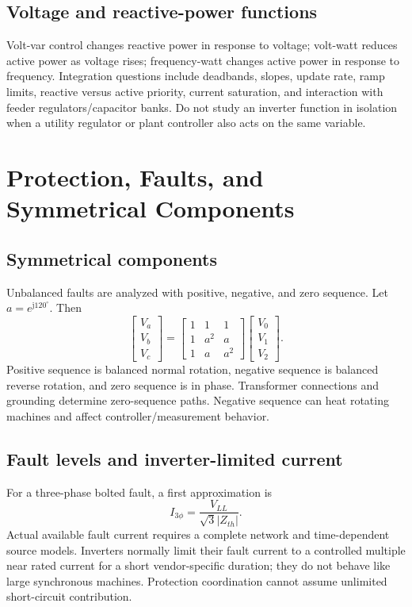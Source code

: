 \documentclass[11pt]{article}
\newcommand{\V}{\mathrm{V}}
\newcommand{\jop}{\mathrm{j}}
\begin{document}
\subsection{Voltage and reactive-power functions}
Volt-var control changes reactive power in response to voltage; volt-watt
reduces active power as voltage rises; frequency-watt changes active power in
response to frequency. Integration questions include deadbands, slopes, update
rate, ramp limits, reactive versus active priority, current saturation, and
interaction with feeder regulators/capacitor banks. Do not study an inverter
function in isolation when a utility regulator or plant controller also acts on
the same variable.

\section{Protection, Faults, and Symmetrical Components}

\subsection{Symmetrical components}
Unbalanced faults are analyzed with positive, negative, and zero sequence. Let
$a=e^{\jop120^\circ}$. Then
\[
\begin{bmatrix}V_a\\V_b\\V_c\end{bmatrix}=
\begin{bmatrix}1&1&1\\1&a^2&a\\1&a&a^2\end{bmatrix}
\begin{bmatrix}V_0\\V_1\\V_2\end{bmatrix}.
\]
Positive sequence is balanced normal rotation, negative sequence is balanced
reverse rotation, and zero sequence is in phase. Transformer connections and
grounding determine zero-sequence paths. Negative sequence can heat rotating
machines and affect controller/measurement behavior.

\subsection{Fault levels and inverter-limited current}
For a three-phase bolted fault, a first approximation is
\[
I_{3\phi}=\frac{V_{LL}}{\sqrt3|Z_{th}|}.
\]
Actual available fault current requires a complete network and time-dependent
source models. Inverters normally limit their fault current to a controlled
multiple near rated current for a short vendor-specific duration; they do not
behave like large synchronous machines. Protection coordination cannot assume
unlimited short-circuit contribution.
\end{document}
